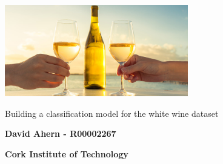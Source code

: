 \begin{titlepage}
    \begin{center}
    	\includegraphics[width=0.6\textwidth]{images/white-wine.jpg}
    	
        \vspace*{1cm}
        
        \vspace{0.5cm}
        Building a classification model for the white wine dataset
        
        \vspace{1.5cm}
        
        \textbf{David Ahern - R00002267}
        
        \vspace{0.5cm}
        \textbf{Cork Institute of Technology}
        
    \end{center}
\end{titlepage}